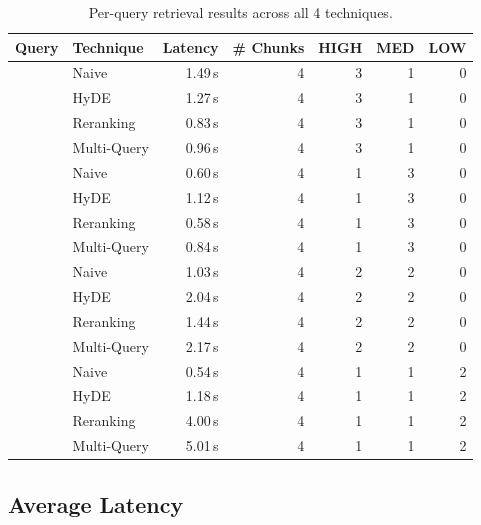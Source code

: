 \documentclass[11pt, letterpaper]{article}
\begin{document}
\begin{table}[H]
\centering\small
\begin{tabularx}{\textwidth}{@{}l l r r r r r@{}}
\toprule
\textbf{Query} & \textbf{Technique} & \textbf{Latency} & \textbf{\# Chunks} & \textbf{HIGH} & \textbf{MED} & \textbf{LOW} \\
\midrule
{}
    & Naive       & 1.49\,s & 4 & 3 & 1 & 0 \\
    & HyDE        & 1.27\,s & 4 & 3 & 1 & 0 \\
    & Reranking   & 0.83\,s & 4 & 3 & 1 & 0 \\
    & Multi-Query & 0.96\,s & 4 & 3 & 1 & 0 \\
\midrule
{}
    & Naive       & 0.60\,s & 4 & 1 & 3 & 0 \\
    & HyDE        & 1.12\,s & 4 & 1 & 3 & 0 \\
    & Reranking   & 0.58\,s & 4 & 1 & 3 & 0 \\
    & Multi-Query & 0.84\,s & 4 & 1 & 3 & 0 \\
\midrule
{}
    & Naive       & 1.03\,s & 4 & 2 & 2 & 0 \\
    & HyDE        & 2.04\,s & 4 & 2 & 2 & 0 \\
    & Reranking   & 1.44\,s & 4 & 2 & 2 & 0 \\
    & Multi-Query & 2.17\,s & 4 & 2 & 2 & 0 \\
\midrule
{}
    & Naive       & 0.54\,s & 4 & 1 & 1 & 2 \\
    & HyDE        & 1.18\,s & 4 & 1 & 1 & 2 \\
    & Reranking   & 4.00\,s & 4 & 1 & 1 & 2 \\
    & Multi-Query & 5.01\,s & 4 & 1 & 1 & 2 \\
\bottomrule
\end{tabularx}
\caption{Per-query retrieval results across all 4 techniques.}
\end{table}

\subsection{Average Latency}
\end{document}
